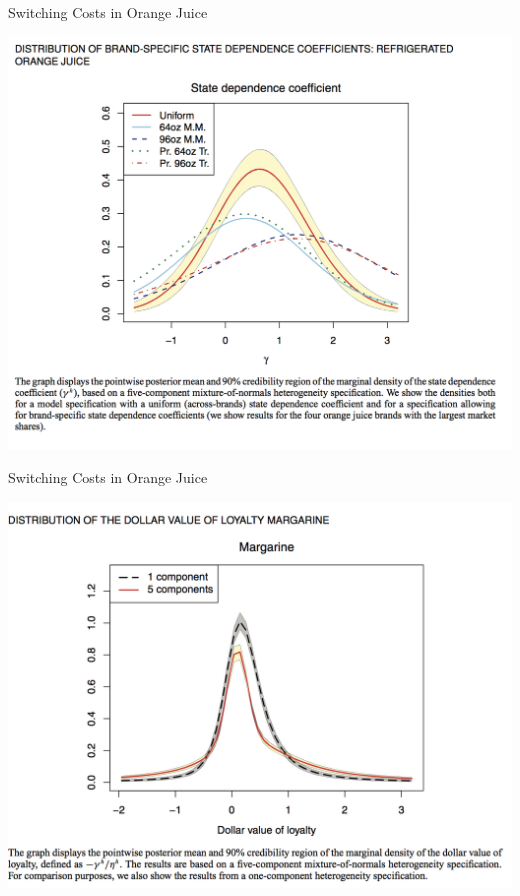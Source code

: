 \documentclass[xcolor=pdftex,dvipsnames,table,mathserif,aspectratio=169]{beamer}
\begin{document}
\begin{frame}{Switching Costs in Orange Juice}
\begin{center}
\includegraphics[scale=0.33]{resources/OJ_F8.png}
\end{center}
\end{frame}


\begin{frame}{Switching Costs in Orange Juice}
\begin{center}
\includegraphics[scale=0.33]{resources/OJ_F11.png}
\end{center}
\end{frame}
\end{document}
